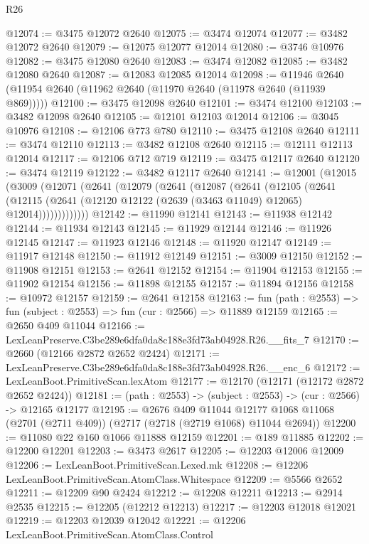 \begin{lexlean}{R26}
\begin{coremodule}
@12074 := @3475 @12072 @2640
@12075 := @3474 @12074
@12077 := @3482 @12072 @2640
@12079 := @12075 @12077 @12014
@12080 := @3746 @10976
@12082 := @3475 @12080 @2640
@12083 := @3474 @12082
@12085 := @3482 @12080 @2640
@12087 := @12083 @12085 @12014
@12098 := @11946 @2640 (@11954 @2640 (@11962 @2640 (@11970 @2640 (@11978 @2640 (@11939 @869)))))
@12100 := @3475 @12098 @2640
@12101 := @3474 @12100
@12103 := @3482 @12098 @2640
@12105 := @12101 @12103 @12014
@12106 := @3045 @10976
@12108 := @12106 @773 @780
@12110 := @3475 @12108 @2640
@12111 := @3474 @12110
@12113 := @3482 @12108 @2640
@12115 := @12111 @12113 @12014
@12117 := @12106 @712 @719
@12119 := @3475 @12117 @2640
@12120 := @3474 @12119
@12122 := @3482 @12117 @2640
@12141 := @12001
    (@12015
      (@3009
        (@12071
          (@2641
            (@12079
              (@2641
                (@12087
                  (@2641
                    (@12105
                      (@2641
                        (@12115
                          (@2641 (@12120 @12122 (@2639 (@3463 @11049) @12065) @12014)))))))))))))
@12142 := @11990 @12141
@12143 := @11938 @12142
@12144 := @11934 @12143
@12145 := @11929 @12144
@12146 := @11926 @12145
@12147 := @11923 @12146
@12148 := @11920 @12147
@12149 := @11917 @12148
@12150 := @11912 @12149
@12151 := @3009 @12150
@12152 := @11908 @12151
@12153 := @2641 @12152
@12154 := @11904 @12153
@12155 := @11902 @12154
@12156 := @11898 @12155
@12157 := @11894 @12156
@12158 := @10972 @12157
@12159 := @2641 @12158
@12163 := fun (path : @2553) => fun (subject : @2553) => fun (cur : @2566) => @11889 @12159
@12165 := @2650 @409 @11044
@12166 := LexLeanPreserve.C3be289e6dfa0da8c188e3fd73ab04928.R26.__fits_7
@12170 := @2660 (@12166 @2872 @2652 @2424)
@12171 := LexLeanPreserve.C3be289e6dfa0da8c188e3fd73ab04928.R26.__enc_6
@12172 := LexLeanBoot.PrimitiveScan.lexAtom
@12177 := @12170 (@12171 (@12172 @2872 @2652 @2424))
@12181 := (path : @2553) -> (subject : @2553) -> (cur : @2566) -> @12165 @12177
@12195 := @2676
    @409
    @11044
    @12177
    @1068
    @11068
    (@2701 (@2711 @409))
    (@2717 (@2718 (@2719 @1068) @11044 @2694))
@12200 := @11080 @22 @160 @1066 @11888 @12159
@12201 := @189 @11885
@12202 := @12200 @12201
@12203 := @3473 @2617
@12205 := @12203 @12006 @12009
@12206 := LexLeanBoot.PrimitiveScan.Lexed.mk
@12208 := @12206 LexLeanBoot.PrimitiveScan.AtomClass.Whitespace
@12209 := @5566 @2652
@12211 := @12209 @90 @2424
@12212 := @12208 @12211
@12213 := @2914 @2535
@12215 := @12205 (@12212 @12213)
@12217 := @12203 @12018 @12021
@12219 := @12203 @12039 @12042
@12221 := @12206 LexLeanBoot.PrimitiveScan.AtomClass.Control

\end{coremodule}
\end{lexlean}
